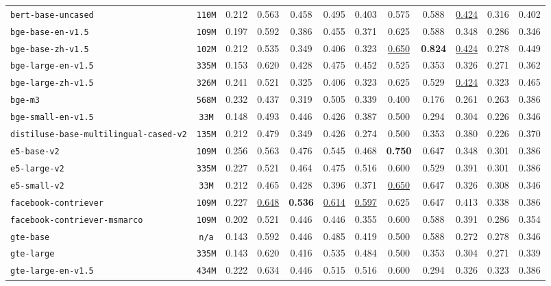 \documentclass{article}
\begin{document}
\begin{table}[htbp]
{\begin{tabular}{lccccccccccc}
\texttt{bert-base-uncased} & \texttt{110M} & 0.212 & 0.563 & 0.458 & 0.495 & 0.403 & 0.575 & 0.588 & \underline{0.424} & 0.316 & 0.402 \\
\texttt{bge-base-en-v1.5} & \texttt{109M} & 0.197 & 0.592 & 0.386 & 0.455 & 0.371 & 0.625 & 0.588 & 0.348 & 0.286 & 0.346 \\
\texttt{bge-base-zh-v1.5} & \texttt{102M} & 0.212 & 0.535 & 0.349 & 0.406 & 0.323 & \underline{0.650} & \textbf{0.824} & \underline{0.424} & 0.278 & 0.449 \\
\texttt{bge-large-en-v1.5} & \texttt{335M} & 0.153 & 0.620 & 0.428 & 0.475 & 0.452 & 0.525 & 0.353 & 0.326 & 0.271 & 0.362 \\
\texttt{bge-large-zh-v1.5} & \texttt{326M} & 0.241 & 0.521 & 0.325 & 0.406 & 0.323 & 0.625 & 0.529 & \underline{0.424} & 0.323 & 0.465 \\
\texttt{bge-m3} & \texttt{568M} & 0.232 & 0.437 & 0.319 & 0.505 & 0.339 & 0.400 & 0.176 & 0.261 & 0.263 & 0.386 \\
\texttt{bge-small-en-v1.5} & \texttt{33M} & 0.148 & 0.493 & 0.446 & 0.426 & 0.387 & 0.500 & 0.294 & 0.304 & 0.226 & 0.346 \\
\texttt{distiluse-base-multilingual-cased-v2} & \texttt{135M} & 0.212 & 0.479 & 0.349 & 0.426 & 0.274 & 0.500 & 0.353 & 0.380 & 0.226 & 0.370 \\
\texttt{e5-base-v2} & \texttt{109M} & 0.256 & 0.563 & 0.476 & 0.545 & 0.468 & \textbf{0.750} & 0.647 & 0.348 & 0.301 & 0.386 \\
\texttt{e5-large-v2} & \texttt{335M} & 0.227 & 0.521 & 0.464 & 0.475 & 0.516 & 0.600 & 0.529 & 0.391 & 0.301 & 0.386 \\
\texttt{e5-small-v2} & \texttt{33M} & 0.212 & 0.465 & 0.428 & 0.396 & 0.371 & \underline{0.650} & 0.647 & 0.326 & 0.308 & 0.346 \\
\texttt{facebook-contriever} & \texttt{109M} & 0.227 & \underline{0.648} & \textbf{0.536} & \underline{0.614} & \underline{0.597} & 0.625 & 0.647 & 0.413 & 0.338 & 0.386 \\
\texttt{facebook-contriever-msmarco} & \texttt{109M} & 0.202 & 0.521 & 0.446 & 0.446 & 0.355 & 0.600 & 0.588 & 0.391 & 0.286 & 0.354 \\
\texttt{gte-base} & \texttt{n/a} & 0.143 & 0.592 & 0.446 & 0.485 & 0.419 & 0.500 & 0.588 & 0.272 & 0.278 & 0.346 \\
\texttt{gte-large} & \texttt{335M} & 0.143 & 0.620 & 0.416 & 0.535 & 0.484 & 0.500 & 0.353 & 0.304 & 0.271 & 0.339 \\
\texttt{gte-large-en-v1.5} & \texttt{434M} & 0.222 & 0.634 & 0.446 & 0.515 & 0.516 & 0.600 & 0.294 & 0.326 & 0.323 & 0.386 \\

\end{tabular}}
\end{table}
\end{document}
